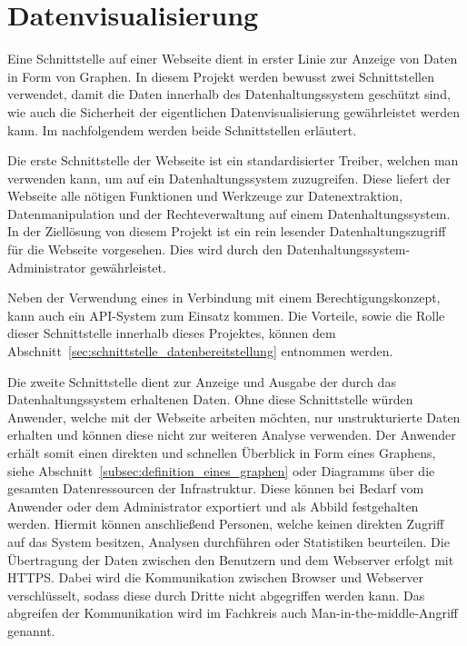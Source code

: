 \section{Datenvisualisierung}
Eine Schnittstelle auf einer Webseite dient in erster Linie zur Anzeige
von Daten in Form von Graphen. In diesem Projekt werden bewusst zwei
Schnittstellen verwendet, damit die Daten innerhalb des Datenhaltungssystem
geschützt sind, wie auch die Sicherheit der eigentlichen Datenvisualisierung
gewährleistet werden kann. Im nachfolgendem werden beide Schnittstellen
erläutert.

Die erste Schnittstelle der Webseite ist ein standardisierter \gls{Treiber},
welchen man verwenden kann, um auf ein Datenhaltungssystem zuzugreifen. Diese
liefert der Webseite alle nötigen Funktionen und Werkzeuge zur
Datenextraktion, Datenmanipulation und der Rechteverwaltung auf einem
Datenhaltungssystem. In der Ziellösung von diesem Projekt ist ein rein lesender
Datenhaltungszugriff für die Webseite vorgesehen. Dies wird durch den
Datenhaltungssystem\hyp{}Administrator gewährleistet.

Neben der Verwendung eines  in Verbindung mit einem
Berechtigungskonzept, kann auch ein \gls{API}\hyp{}System zum Einsatz kommen.
Die Vorteile, sowie die Rolle dieser Schnittstelle innerhalb dieses Projektes,
können dem Abschnitt~\ref{sec:schnittstelle_datenbereitstellung} entnommen
werden.

Die zweite Schnittstelle dient zur Anzeige und Ausgabe der durch das
Datenhaltungssystem erhaltenen Daten. Ohne diese Schnittstelle würden Anwender,
welche mit der Webseite arbeiten möchten, nur unstrukturierte Daten
erhalten und können diese nicht zur weiteren Analyse verwenden. Der Anwender
erhält somit einen direkten und schnellen Überblick in Form eines Graphens,
siehe Abschnitt~\ref{subsec:definition_eines_graphen} oder
Diagramms über die gesamten Datenressourcen der Infrastruktur. Diese können bei
Bedarf vom Anwender oder dem Administrator exportiert und als Abbild
festgehalten werden. Hiermit können anschließend Personen, welche keinen
direkten Zugriff auf das System besitzen, Analysen durchführen oder Statistiken
beurteilen. Die Übertragung der Daten zwischen den Benutzern und dem Webserver
erfolgt mit \gls{HTTPS}. Dabei wird die Kommunikation zwischen Browser und
Webserver verschlüsselt, sodass diese durch Dritte nicht abgegriffen werden
kann. Das abgreifen der Kommunikation wird im Fachkreis auch
Man\hyp{}in\hyp{}the\hyp{}middle\hyp{}Angriff genannt.
\mr%

